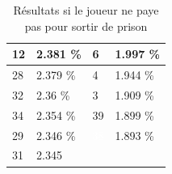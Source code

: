 \documentclass[letterpaper]{article}
\begin{document}
\begin{table}[h]
\begin{tabular}{|l|l||l|l|}
	  \cellcolor[HTML]{FF69B4} 12 & 2.381 \%  & \cellcolor[HTML]{E6E6FA}  6 & 1.997 \% \\ \hline
	  \cellcolor[HTML]{FFD700} 28 & 2.379 \%  & \cellcolor[HTML]{A0522D}  4 & 1.944 \% \\ \hline
	  \cellcolor[HTML]{2E8B57} 32 & 2.36 \%   & \cellcolor[HTML]{EEEED1}  3 & 1.909 \% \\ \hline
	  \cellcolor[HTML]{EEEED1} 34 & 2.354 \%  & \cellcolor[HTML]{8B1A1A} 39 & 1.899 \% \\ \hline
	  \cellcolor[HTML]{FFFFF0} 29 & 2.346 \%  & \cellcolor[HTML]{483D8B} \textcolor{white}{38} & 1.893 \%  \\ \hline
	  \cellcolor[HTML]{BEBEBE} 31 & 2.345 \\ \cline{1-2}
	\end{tabular}
	\caption{Résultats si le joueur ne paye pas pour sortir de prison}
	\label{result_paye_pas}
      \end{table}
	
\end{document}
